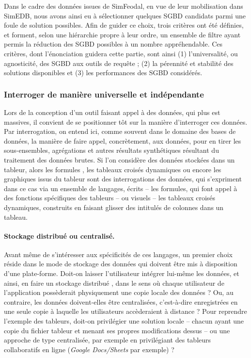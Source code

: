 Dans le cadre des données issues de SimFeodal, en vue de leur mobilisation dans SimEDB, nous avons ainsi eu à sélectionner quelques SGBD candidats parmi une foule de solution possibles.
Afin de guider ce choix, trois critères ont été définies, et forment, selon une hiérarchie propre à leur ordre, un ensemble de filtre ayant permis la réduction des SGBD possibles à un nombre appréhendable.
Ces critères, dont l'énonciation guidera cette partie, sont ainsi (1) l'universalité, ou \og agnosticité\fg{}, des SGBD aux outils de requête ; (2) la pérennité et stabilité des solutions disponibles et (3) les performances des SGBD considérés.

\subsubsection{Interroger de manière universelle et indépendante}

Lors de la conception d'un outil faisant appel à des données, qui plus est massives, il convient de se positionner tôt sur la manière d'interroger ces données.
Par interrogation, on entend ici, comme souvent dans le domaine des bases de données, la manière de faire appel, concrètement, aux données, pour en tirer les sous-ensembles, agrégations et autres résultats synthétiques résultant du traitement des données brutes.
Si l'on considère des données stockées dans un tableur, alors les \og formules \fg{}, les tableaux croisés dynamiques ou encore les graphiques issus du tableur sont des interrogations des données, qui s'expriment dans ce cas via un ensemble de langages, écrits -- les formules, qui font appel à des fonctions spécifiques des tableurs -- ou visuels -- les tableaux croisés dynamiques, construits en faisant glisser des intitulés de colonnes dans un tableau.

\paragraph{Stockage distribué ou centralisé.}\label{par:stockage-centralise}
Avant même de s'intéresser aux spécificités de ces langages, un premier choix réside dans le mode de stockage des données qui doivent être mis à disposition d'une plate-forme.
Doit-on laisser l'utilisateur intégrer lui-même les données, et ainsi, en faire un stockage \og distribué \fg{}, dans le sens où chaque utilisateur de l'application possèderait physiquement une copie locale des données ?
Ou, au contraire, les données doivent-elles être centralisées, c'est-à-dire enregistrées en une seule copie à laquelle les utilisateurs accèderaient à distance ?
Pour reprendre l'exemple des tableurs, doit-on privilégier une solution locale -- chacun ayant une copie du fichier tableur et menant ses propres modifications dessus -- ou une approche de type centralisée, par exemple en privilégiant des tableurs collaboratifs en ligne (\textit{Google Docs/Sheets} par exemple) ?

